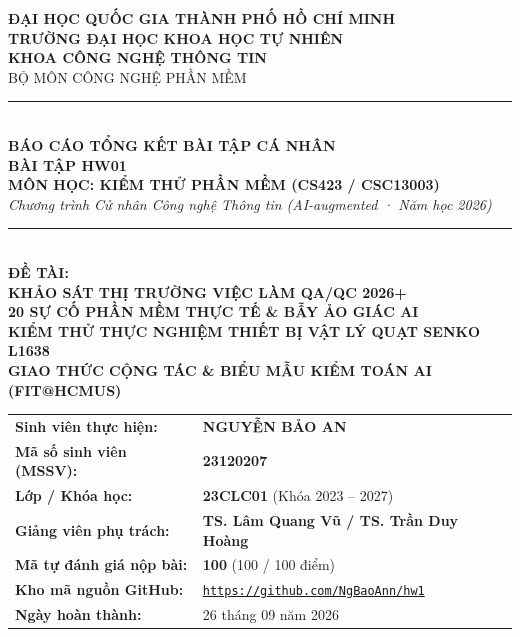 \documentclass[11pt,a4paper]{article}
\begin{document}
\begin{titlepage}
\thispagestyle{empty}
\begin{tcolorbox}[colback=white, colframe=hcmusblue, boxrule=2pt, arc=0mm, height=\textheight]
\begin{center}
    {\large \textbf{ĐẠI HỌC QUỐC GIA THÀNH PHỐ HỒ CHÍ MINH}}\\[2mm]
    {\large \textbf{TRƯỜNG ĐẠI HỌC KHOA HỌC TỰ NHIÊN}}\\[2mm]
    {\large \textbf{KHOA CÔNG NGHỆ THÔNG TIN}}\\[1mm]
    {\normalsize BỘ MÔN CÔNG NGHỆ PHẦN MỀM}\\[14mm]
    
    \rule{0.8\textwidth}{1.5pt}\\[5mm]
    {\LARGE \textbf{\color{hcmusblue}BÁO CÁO TỔNG KẾT BÀI TẬP CÁ NHÂN}}\\[3mm]
    {\huge \textbf{\color{hcmusblue}BÀI TẬP HW01}}\\[4mm]
    {\large \textbf{MÔN HỌC: KIỂM THỬ PHẦN MỀM (CS423 / CSC13003)}}\\[2mm]
    {\normalsize \textit{Chương trình Cử nhân Công nghệ Thông tin (AI-augmented · Năm học 2026)}}\\[4mm]
    \rule{0.8\textwidth}{1.5pt}\\[10mm]
    
    {\large \textbf{ĐỀ TÀI:}}\\[2mm]
    {\large \textbf{KHẢO SÁT THỊ TRƯỜNG VIỆC LÀM QA/QC 2026+}}\\[1.5mm]
    {\large \textbf{20 SỰ CỐ PHẦN MỀM THỰC TẾ \& BẪY ẢO GIÁC AI}}\\[1.5mm]
    {\large \textbf{KIỂM THỬ THỰC NGHIỆM THIẾT BỊ VẬT LÝ QUẠT SENKO L1638}}\\[1.5mm]
    {\large \textbf{GIAO THỨC CỘNG TÁC \& BIỂU MẪU KIỂM TOÁN AI (FIT@HCMUS)}}\\[12mm]
    
    \begin{minipage}{0.88\textwidth}
    \begin{tabular}{ll}
        \textbf{Sinh viên thực hiện:} & \textbf{NGUYỄN BẢO AN} \\
        \textbf{Mã số sinh viên (MSSV):} & \textbf{23120207} \\
        \textbf{Lớp / Khóa học:} & \textbf{23CLC01} (Khóa 2023 -- 2027) \\
        \textbf{Giảng viên phụ trách:} & \textbf{TS. Lâm Quang Vũ / TS. Trần Duy Hoàng} \\
        \textbf{Mã tự đánh giá nộp bài:} & \textbf{100} (100 / 100 điểm) \\
        \textbf{Kho mã nguồn GitHub:} & \href{https://github.com/NgBaoAnn/hw1}{\texttt{https://github.com/NgBaoAnn/hw1}} \\
        \textbf{Ngày hoàn thành:} & 26 tháng 09 năm 2026 \\
    \end{tabular}
    \end{minipage}
    

\end{center}
\end{tcolorbox}
\end{titlepage}
\end{document}
